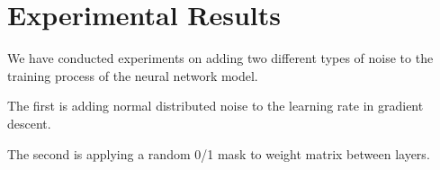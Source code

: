 \section{Experimental Results}
\label{sec:result}


We have conducted experiments on adding two different types of noise
to the training process of the neural network model.

The first is adding normal distributed noise to the learning rate in
gradient descent.

The second is applying a random 0/1 mask to weight matrix between layers.
